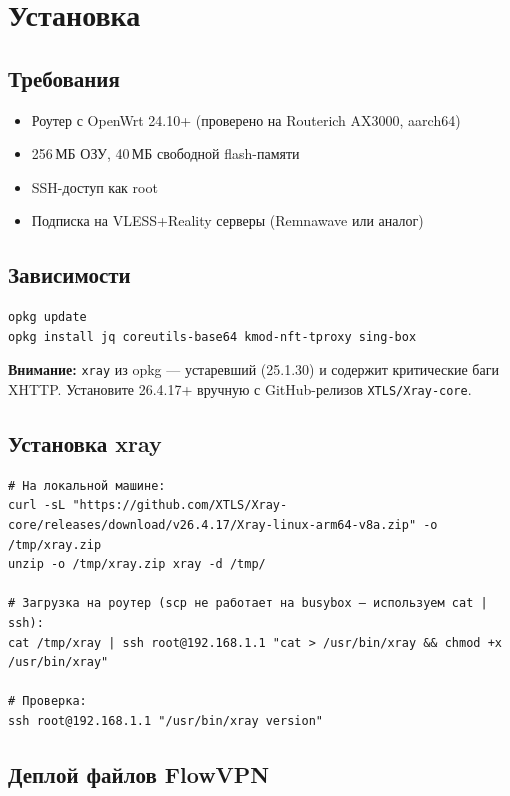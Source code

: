 \documentclass[11pt,a4paper]{article}
\begin{document}
\section{Установка}

\subsection{Требования}

\begin{itemize}
\item Роутер с OpenWrt 24.10+ (проверено на Routerich AX3000, aarch64)
\item 256\,МБ ОЗУ, 40\,МБ свободной flash-памяти
\item SSH-доступ как root
\item Подписка на VLESS+Reality серверы (Remnawave или аналог)
\end{itemize}

\subsection{Зависимости}

\begin{lstlisting}
opkg update
opkg install jq coreutils-base64 kmod-nft-tproxy sing-box
\end{lstlisting}

\begin{notebox}
\textbf{Внимание:} \texttt{xray} из opkg — устаревший (25.1.30) и содержит критические баги XHTTP. Установите 26.4.17+ вручную с GitHub-релизов \texttt{XTLS/Xray-core}.
\end{notebox}

\subsection{Установка xray}

\begin{lstlisting}
# На локальной машине:
curl -sL "https://github.com/XTLS/Xray-core/releases/download/v26.4.17/Xray-linux-arm64-v8a.zip" -o /tmp/xray.zip
unzip -o /tmp/xray.zip xray -d /tmp/

# Загрузка на роутер (scp не работает на busybox — используем cat | ssh):
cat /tmp/xray | ssh root@192.168.1.1 "cat > /usr/bin/xray && chmod +x /usr/bin/xray"

# Проверка:
ssh root@192.168.1.1 "/usr/bin/xray version"
\end{lstlisting}

\subsection{Деплой файлов FlowVPN}
\end{document}
